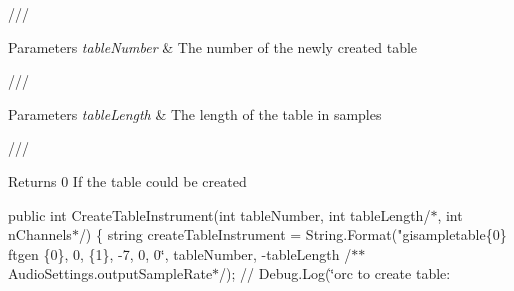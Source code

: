 /// 
\begin{DoxyParams}{Parameters}
{\em table\+Number} & The number of the newly created table\\
\hline
\end{DoxyParams}
/// 
\begin{DoxyParams}{Parameters}
{\em table\+Length} & The length of the table in samples\\
\hline
\end{DoxyParams}
/// \begin{DoxyReturn}{Returns}
0 If the table could be created
\end{DoxyReturn}
public int Create\+Table\+Instrument(int table\+Number, int table\+Length/$\ast$, int n\+Channels$\ast$/) \{ string create\+Table\+Instrument = String.\+Format("{}gisampletable\{0\} ftgen \{0\}, 0, \{1\}, -\/7, 0, 0\char`\"{}, table\+Number, -\/table\+Length /$\ast$$\ast$ Audio\+Settings.\+output\+Sample\+Rate$\ast$/);     // Debug.\+Log(\char`\"{}orc to create table\+: ~\newline
$$
